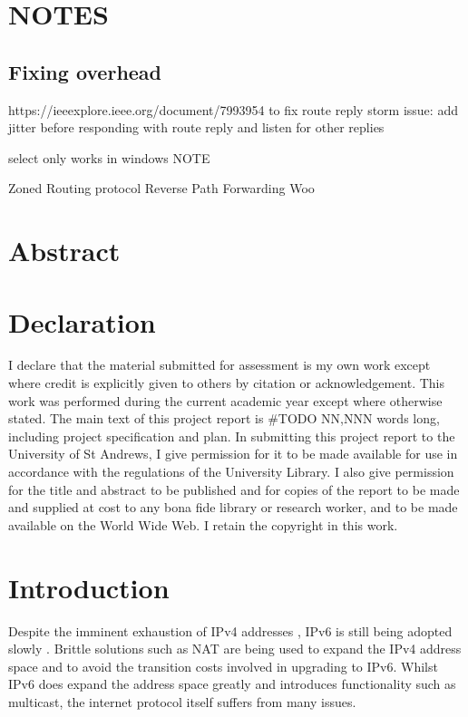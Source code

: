 \documentclass[12pt]{article}
\begin{document}

\section{NOTES}

\subsection{Fixing overhead}

https://ieeexplore.ieee.org/document/7993954 to fix route reply storm issue: add jitter before responding with route reply and listen for other replies

select only works in windows NOTE

Zoned Routing protocol 
Reverse Path Forwarding
Woo

\section*{Abstract}

\section*{Declaration}
I declare that the material submitted for
assessment is my own work except where credit is
explicitly given to others by citation or
acknowledgement. This work was performed during
the current academic year except where otherwise
stated.
The main text of this project report is \#TODO NN,NNN
words long, including project specification and plan.
In submitting this project report to the University of
St Andrews, I give permission for it to be made
available for use in accordance with the regulations of
the University Library. I also give permission for
the title and abstract to be published and for copies of
the report to be made and supplied at cost to any bona
fide library or research worker, and to be made
available on the World Wide Web. I retain the
copyright in this work.

\newpage

\tableofcontents

\newpage
{}
\setcounter{page}{1} 

\section{Introduction}

Despite the imminent exhaustion of IPv4 addresses \cite{ripe_labs}, IPv6 is still being adopted slowly \cite{google_ipv6}. Brittle solutions such as NAT are being used to expand the IPv4 address space and to avoid the transition costs involved in upgrading to IPv6. Whilst IPv6 does expand the address space greatly and introduces functionality such as multicast, the internet protocol itself suffers from many issues. 
\end{document}
